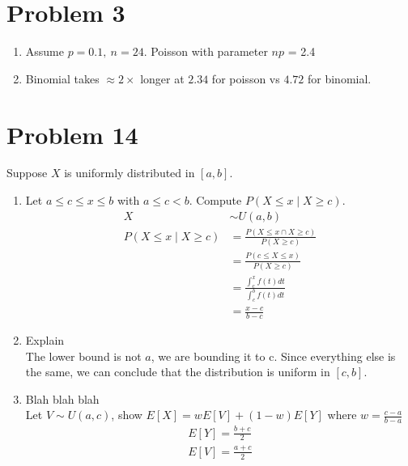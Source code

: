 \documentclass{article}
\begin{document}
\section*{Problem 3}
\begin{enumerate}[label=\alph*)]
    \item Assume \(p = 0.1,\ n = 24\). Poisson with parameter \(np\) = 2.4
    \item Binomial takes \(\approx 2 \times\) longer at \(2.34\) for poisson vs \(4.72\) for binomial.
\end{enumerate}

\section*{Problem 14}
Suppose \(X\) is uniformly distributed in \([a, b]\).
\begin{enumerate}[label=\alph*)]
    \item Let \(a \leq c \leq x \leq b\) with \(a \leq c < b\). Compute \(P(X \leq x \mid X \geq c)\).
          \begin{align*}
              X                         & \sim U(a, b)                                    \\
              P(X \leq x \mid X \geq c) & = \frac{P(X \leq x \cap X \geq c)}{P(X \geq c)} \\
                                        & = \frac{P(c\leq X \leq x)}{P(X \geq c)}         \\
                                        & = \frac{\int_{c}^{x}f(t)dt}{\int_{c}^{b}f(t)dt} \\
                                        & = \frac{x - c}{b - c}
          \end{align*}
    \item Explain \\
          The lower bound is not \(a\), we are bounding it to c. Since everything else is the same, we can conclude that the distribution is uniform in \([c, b]\).
    \item Blah blah blah \\
          Let \(V \sim U(a, c)\), show \(E[X] = wE[V] + (1-w)E[Y]\) where \(w = \frac{c-a}{b-a}\)
          \begin{align*}
              E[Y] = \frac{b+c}{2} \\
              E[V] = \frac{a+c}{2} \\
          \end{align*}
\end{enumerate}
\end{document}
